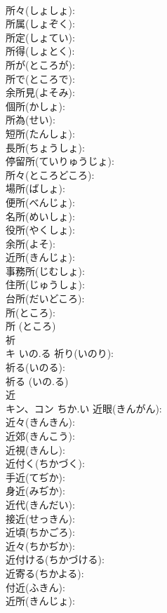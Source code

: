 \documentclass[8pt]{extreport}
\begin{document}
\begin{CJK}{UTF8}{min}
\\	所々(しょしょ): 
\\	所属(しょぞく): 
\\	所定(しょてい): 
\\	所得(しょとく): 
\\	所が(ところが): 
\\	所で(ところで): 
\\	余所見(よそみ): 
\\	個所(かしょ): 
\\	所為(せい): 
\\	短所(たんしょ): 
\\	長所(ちょうしょ): 
\\	停留所(ていりゅうじょ): 
\\	所々(ところどころ): 
\\	場所(ばしょ): 
\\	便所(べんじょ): 
\\	名所(めいしょ): 
\\	役所(やくしょ): 
\\	余所(よそ): 
\\	近所(きんじょ): 
\\	事務所(じむしょ): 
\\	住所(じゅうしょ): 
\\	台所(だいどころ): 
\\	所(ところ): 
\\	所 (ところ)
\\	祈			
\\	キ	いの.る	祈り(いのり): 
\\	祈る(いのる): 
\\	祈る (いの.る)
\\	近			
\\	キン、コン	ちか.い	近眼(きんがん): 
\\	近々(きんきん): 
\\	近郊(きんこう): 
\\	近視(きんし): 
\\	近付く(ちかづく): 
\\	手近(てぢか): 
\\	身近(みぢか): 
\\	近代(きんだい): 
\\	接近(せっきん): 
\\	近頃(ちかごろ): 
\\	近々(ちかぢか): 
\\	近付ける(ちかづける): 
\\	近寄る(ちかよる): 
\\	付近(ふきん): 
\\	近所(きんじょ): 

\end{CJK}
\end{document}
